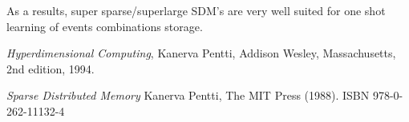 \documentclass[11pt]{article}
\begin{document}
 As a results, super sparse/superlarge SDM's are very well suited for one shot learning of events combinations storage. 




\begin{thebibliography}{9}

  \textit{ Hyperdimensional Computing}, Kanerva Pentti,
  Addison Wesley, Massachusetts,
  2nd edition,
  1994.
 

 \textit{Sparse Distributed Memory}
 Kanerva Pentti,  The MIT Press (1988). ISBN 978-0-262-11132-4

\end{thebibliography}
\end{document}
